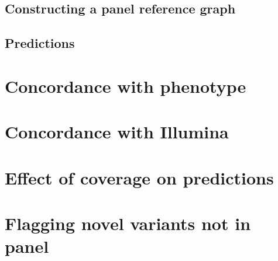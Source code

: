 \subsection{Constructing a panel reference graph}

\subsection{Predictions}

\section{Concordance with phenotype}

\section{Concordance with Illumina}

\section{Effect of coverage on predictions}

\section{Flagging novel variants not in panel}

